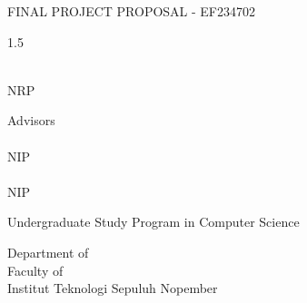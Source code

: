 \begin{large}
  FINAL PROJECT PROPOSAL - EF234702
\end{large}

\vspace{\fill}

\begin{spacing}{1.5}
  \begin{Large}
    \engtatitle{}
  \end{Large}
\end{spacing}

\vspace{\fill}

\begin{large}
  \name{} \\
  \textmd{NRP \nrp{}}
\end{large}

\vspace{\fill}

\begin{large}
  \textmd{Advisors} \\
  \advisor{} \\
  \textmd{NIP \advisornip{}} \\
  \coadvisor{} \\
  \textmd{NIP \coadvisornip{}}
\end{large}

\vspace{\fill}

Undergraduate Study Program in Computer Science \\

\mdseries

Department of \engdepartment{} \\
Faculty of \engfaculty{} \\
Institut Teknologi Sepuluh Nopember

\place{} \\ \the\year{}